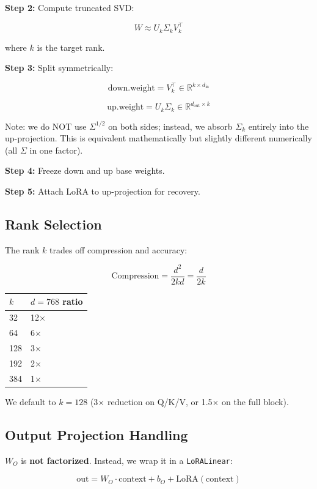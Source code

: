 \textbf{Step 2:} Compute truncated SVD:

\[
W \approx U_k \Sigma_k V_k^\top
\]

where $k$ is the target rank.

\textbf{Step 3:} Split symmetrically:

\[
\text{down.weight} = V_k^\top \in \mathbb{R}^{k \times d_\text{in}}
\]

\[
\text{up.weight} = U_k \Sigma_k \in \mathbb{R}^{d_\text{out} \times k}
\]

Note: we do NOT use $\Sigma^{1/2}$ on both sides; instead, we absorb $\Sigma_k$ 
entirely into the up-projection. This is equivalent mathematically but 
slightly different numerically (all $\Sigma$ in one factor).

\textbf{Step 4:} Freeze down and up base weights.

\textbf{Step 5:} Attach LoRA to up-projection for recovery.

\subsection{Rank Selection}

The rank $k$ trades off compression and accuracy:

\[
\text{Compression} = \frac{d^2}{2 k d} = \frac{d}{2k}
\]

\begin{table}[H]
\centering
\small
\begin{tabular}{ll}
\toprule
\textbf{$k$} & \textbf{$d = 768$ ratio} \\
\midrule
32 & 12$\times$ \\
64 & 6$\times$ \\
128 & 3$\times$ \\
192 & 2$\times$ \\
384 & 1$\times$ \\
\bottomrule
\end{tabular}
\end{table}

We default to $k = 128$ (3$\times$ reduction on Q/K/V, or 1.5$\times$ on the full block).

\subsection{Output Projection Handling}

$W_O$ is \textbf{not factorized}. Instead, we wrap it in a \texttt{LoRALinear}:

\[
\text{out} = W_O \cdot \text{context} + b_O + \text{LoRA}(\text{context})
\]

